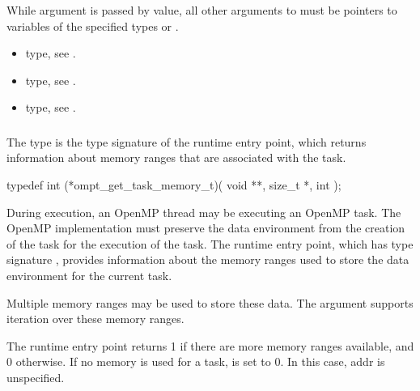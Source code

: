 \constraints
While argument  is passed by value, all other arguments to 
 must be pointers to variables of the specified types 
or .

\crossreferences
\begin{itemize}
\item {} type, see .

\item {} type, see .

\item {} type, see .
\end{itemize}



\subsubsection{}
\label{sec:ompt_get_task_memory_t}
\label{sec:ompt_get_task_memory}

\summary
The  type is the type signature of the 
 runtime entry point, which returns information 
about memory ranges that are associated with the task.

\format
\begin{ccppspecific}
\begin{omptInquiry}
typedef int (*ompt_get_task_memory_t)(
  void **,
  size_t *,
  int 
);
\end{omptInquiry}
\end{ccppspecific}

\descr
During execution, an OpenMP thread may be executing an OpenMP task. The 
OpenMP implementation must preserve the data environment from the creation 
of the task for the execution of the task. The  
runtime entry point, which has type signature ,
provides information about the  memory ranges used to store the data 
environment for the current task.

Multiple memory ranges may be used to store these data. The  
argument supports iteration over these memory ranges.

The  runtime entry point returns 1 if there 
are more memory ranges available, and 0 otherwise. If no memory is used 
for a task,  is set to 0. In this case, addr is unspecified.

